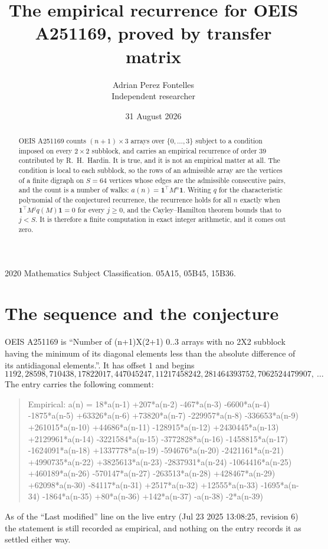 \documentclass[11pt,a4paper]{article}
\title{The empirical recurrence for OEIS A251169, proved by transfer matrix}
\author{Adrian Perez Fontelles\\ \small Independent researcher}
\date{31 August 2026}
\theoremstyle{plain}
\theoremstyle{definition}
\begin{document}
\maketitle

\begin{abstract}
OEIS A251169 counts $(n+1)\times3$ arrays over $\{0,\dots,3\}$ subject to a condition imposed on
every $2\times2$ subblock, and carries an empirical recurrence of order $39$ contributed
by R.~H.~Hardin. It is true, and it is not an empirical matter at all. The condition is local
to each subblock, so the rows of an admissible array are the vertices of a finite digraph
on $S=64$ vertices whose edges are the admissible consecutive pairs, and the count is a
number of walks: $a(n)=\mathbf{1}^{\!\top}M^{n}\mathbf{1}$. Writing $q$
for the characteristic polynomial of the conjectured recurrence, the recurrence holds for all
$n$ exactly when $\mathbf{1}^{\!\top}M^{j}q(M)\mathbf{1}=0$ for every $j\ge0$, and the
Cayley--Hamilton theorem bounds that to $j<S$. It is therefore a finite computation in exact
integer arithmetic, and it comes out zero.
\end{abstract}

\noindent\small 2020 Mathematics Subject Classification. 05A15, 05B45, 15B36.\normalsize

\section{The sequence and the conjecture}

OEIS A251169 is ``Number of (n+1)X(2+1) 0..3 arrays with no 2X2 subblock having the minimum of its diagonal elements less than the absolute difference of its antidiagonal elements.''. It has offset $1$ and begins
\[
1192, 28598, 710438, 17822017, 447045247, 11217458242, 281464393752, 7062524479907,\ \dots
\]
The entry carries the following comment:
\begin{quote}\small
Empirical: a(n) = 18*a(n-1) +207*a(n-2) -467*a(n-3) -6600*a(n-4) -1875*a(n-5) +63326*a(n-6) +73820*a(n-7) -229957*a(n-8) -336653*a(n-9) +261015*a(n-10) +44686*a(n-11) -128915*a(n-12) +2430445*a(n-13) +2129961*a(n-14) -3221584*a(n-15) -3772828*a(n-16) -1458815*a(n-17) -1624091*a(n-18) +1337778*a(n-19) -594676*a(n-20) -2421161*a(n-21) +4990735*a(n-22) +3825613*a(n-23) -2837931*a(n-24) -1064416*a(n-25) +460189*a(n-26) -570147*a(n-27) -263513*a(n-28) +428467*a(n-29) +62098*a(n-30) -84117*a(n-31) +2517*a(n-32) +12555*a(n-33) -1695*a(n-34) -1864*a(n-35) +80*a(n-36) +142*a(n-37) -a(n-38) -2*a(n-39)
\end{quote}
As of the ``Last modified'' line on the live entry (Jul 23 2025 13:08:25, revision 6) the statement is
still recorded as empirical, and nothing on the entry records it as settled either way.
\end{document}
